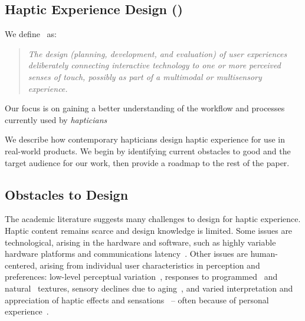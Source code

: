 \subsection{Haptic Experience Design (\haxd{})}
\noindent
We define \haxd\ as: %
\begin{quote}
\it The design (planning, development, and evaluation) of user experiences  deliberately connecting interactive technology to
one or more perceived senses of touch, possibly as part of a multimodal or multisensory experience.
\end{quote}
Our focus is on gaining a better understanding of the workflow and processes currently used by \textit{hapticians}

\begin{quote}
\end{quote}

\noindent
{} %
We describe  how contemporary hapticians design haptic experience for use in real-world products. We begin by identifying current obstacles to good \haxd{} and the target audience for our work,  then provide a roadmap to the rest of the paper.

\subsection{Obstacles to Design} 
\noindent
The academic literature suggests many challenges to design for haptic experience.
Haptic content remains scarce and design knowledge is limited.
Some issues are technological, arising in the hardware and software, such as highly variable hardware platforms and communications latency~\citep{Kaaresoja2014}. 
Other issues are human-centered, arising from individual user characteristics in perception and preferences:
low-level perceptual variation~\citep{Lo1984}, 
responses to programmed~\citep{Levesque2011} and natural~\citep{Hollins2000} textures, 
sensory declines due to aging~\citep{Stevens1992,Stevens1996}, 
and  varied interpretation and appreciation of haptic effects and sensations~\citep{Seifi2013,Seifi2015} -- often because of personal experience~\citep{Schneider2014}.

